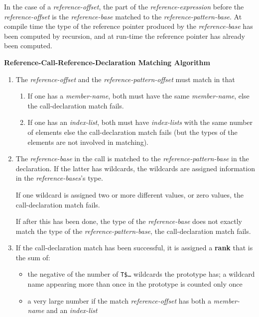 \documentclass[12pt]{article}
\newcommand{\key}[1]{{\rm \bfseries #1}}
\begin{document}
In the case of a {\em reference-offset}, the part of the
{\em reference-expression} before the {\em reference-offset} is
the {\em reference-base} matched to the {\em reference-pattern-base}.
At compile time the type of the reference pointer produced by the
{\em reference-base} has been computed by recursion, and at run-time
the reference pointer has already been computed.

\bigskip

\centerline{\bf Reference-Call-Reference-Declaration Matching Algorithm}
\begin{enumerate}
\item\label{REFERENCE-CALL-REFERENCE-DECLARATION-OFFSET-MATCHING}
The {\em reference-offset} and the {\em  reference-pattern-offset} must
match in that
\begin{enumerate}
\item
If one has a {\em member-name}, both must have the same {\em member-name},
else the call-declaration match fails.
\item
If one has an {\em index-list}, both must have {\em index-lists}
with the same number of elements
else the call-declaration match fails
(but the types of the elements are not involved in matching).
\end{enumerate}

\item\label{REFERENCE-CALL-DECLARATION-ARGUMENT-MATCHING}
The {\em reference-base} in the call is matched to the
{\em reference-pattern-base} in the declaration.
If the latter has wildcards, the wildcards are assigned
information in the {\em reference-bases}'s type.

If one wildcard is assigned two or more different values, or zero values,
the call-declaration match fails.

If after this has been done, the type of the {\em reference-base}
does not exactly match the type of the {\em reference-pattern-base},
the call-declaration match fails.

\item\label{REFERENCE-CALL-DECLARATION-RANK-COMPUTATION}
If the call-declaration match has been successful, it is assigned
a \key{rank} that is the sum of:
\begin{itemize}
\item the negative of the number of {\tt T\$\ldots} wildcards
the prototype has; a wildcard name appearing more than once in
the prototype is counted only once
\item a very large number if the match {\em reference-offset} has
both a {\em member-name} and an {\em index-list}
\end{itemize}

\end{enumerate}
\end{document}
